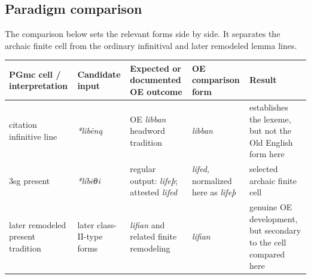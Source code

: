 \documentclass[
  british,
  a4paper,
  openany]{book}
\newcounter{none} %
\begin{document}
\subsection{Paradigm comparison}\label{paradigm-comparison-9}

The comparison below sets the relevant forms side by side. It separates
the archaic finite cell from the ordinary infinitival and later
remodeled lemma lines.

{\def\LTcaptype{none} %
\begin{longtable}[]{@{}
  >{\raggedright\arraybackslash}p{}
  >{\raggedright\arraybackslash}p{}
  >{\raggedright\arraybackslash}p{}
  >{\raggedright\arraybackslash}p{}
  >{\raggedright\arraybackslash}p{}@{}}
\toprule\noalign{}
\begin{minipage}[b]{\linewidth}\raggedright
PGmc cell / interpretation
\end{minipage} & \begin{minipage}[b]{\linewidth}\raggedright
Candidate input
\end{minipage} & \begin{minipage}[b]{\linewidth}\raggedright
Expected or documented OE outcome
\end{minipage} & \begin{minipage}[b]{\linewidth}\raggedright
OE comparison form
\end{minipage} & \begin{minipage}[b]{\linewidth}\raggedright
Result
\end{minipage} \\
\midrule\noalign{}
\endhead
\bottomrule\noalign{}
\endlastfoot
citation infinitive line & {\emph{*libēną}} & OE {\emph{libban}}
headword tradition & {\emph{libban}} & establishes the lexeme, but not
the Old English form here \\
3sg present & {\emph{*líbēθi}} & regular output: {\emph{lifeþ}};
attested {\emph{lifed}} & {\emph{lifed}}, normalized here as
{\emph{lifeþ}} & selected archaic finite cell \\
later remodeled present tradition & later class-II-type forms &
{\emph{lifian}} and related finite remodeling & {\emph{lifian}} &
genuine OE development, but secondary to the cell compared here \\
\end{longtable}
}
\end{document}
